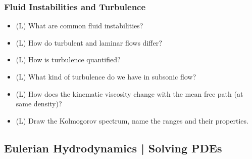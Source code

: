 \subsubsection*{Fluid Instabilities and Turbulence}
\begin{itemize}
    \item (L) What are common fluid instabilities?
    \item (L) How do turbulent and laminar flows differ?
    \item (L) How is turbulence quantified?
    \item (L) What kind of turbulence do we have in subsonic flow?
    \item (L) How does the kinematic viscosity change with the mean free path (at same density)?
    \item (L) Draw the Kolmogorov spectrum, name the ranges and their properties.
\end{itemize}

\subsection*{Eulerian Hydrodynamics | Solving PDEs}

